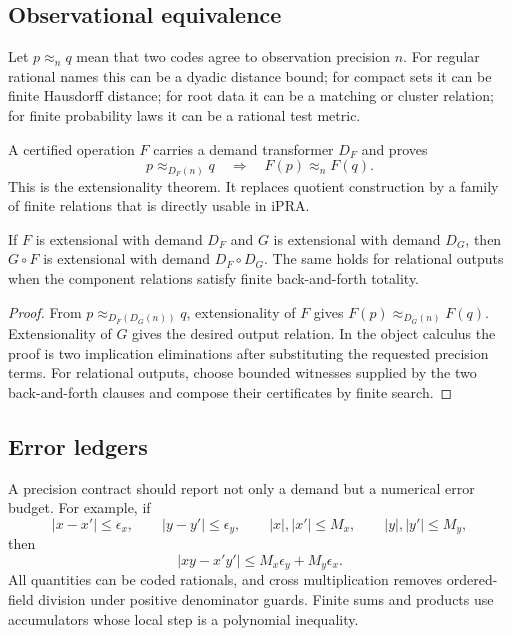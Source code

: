 \subsection{Observational equivalence}

Let \(p\approx_n q\) mean that two codes agree to observation precision \(n\).
For regular rational names this can be a dyadic distance bound; for compact
sets it can be finite Hausdorff distance; for root data it can be a matching or
cluster relation; for finite probability laws it can be a rational test metric.

A certified operation \(F\) carries a demand transformer \(D_F\) and proves
\[
 p\approx_{D_F(n)}q
 \quad\Longrightarrow\quad
 F(p)\approx_n F(q).
\]
This is the extensionality theorem.  It replaces quotient construction by a
family of finite relations that is directly usable in iPRA.

\begin{theorem}
\label{thm:precision-composition}
If \(F\) is extensional with demand \(D_F\) and \(G\) is extensional with
demand \(D_G\), then \(G\circ F\) is extensional with demand
\(D_F\circ D_G\).  The same holds for relational outputs when the component
relations satisfy finite back-and-forth totality.
\end{theorem}

\begin{proof}
From \(p\approx_{D_F(D_G(n))}q\), extensionality of \(F\) gives
\(F(p)\approx_{D_G(n)}F(q)\).  Extensionality of \(G\) gives the desired
output relation.  In the object calculus the proof is two implication
eliminations after substituting the requested precision terms.  For relational
outputs, choose bounded witnesses supplied by the two back-and-forth clauses
and compose their certificates by finite search.
\end{proof}

\subsection{Error ledgers}

A precision contract should report not only a demand but a numerical error
budget.  For example, if
\[
 |x-x'|\le\epsilon_x,
 \qquad |y-y'|\le\epsilon_y,
 \qquad |x|,|x'|\le M_x,
 \qquad |y|,|y'|\le M_y,
\]
then
\[
 |xy-x'y'|\le M_x\epsilon_y+M_y\epsilon_x.
\]
All quantities can be coded rationals, and cross multiplication removes
ordered-field division under positive denominator guards.  Finite sums and
products use accumulators whose local step is a polynomial inequality.

